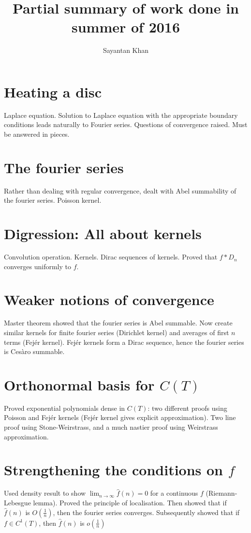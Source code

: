 \documentclass{article}
\title{Partial summary of work done in summer of 2016}
\author{Sayantan Khan}
\begin{document}
\maketitle

\section{Heating a disc}
Laplace equation. Solution to Laplace equation with the appropriate boundary conditions leads naturally to Fourier series. Questions of convergence raised. Must be answered in pieces.

\section{The fourier series}
Rather than dealing with regular convergence, dealt with Abel summability of the fourier series. Poisson kernel.

\section{Digression: All about kernels}
Convolution operation. Kernels. Dirac sequences of kernels. Proved that $f \ast D_n$ converges uniformly to $f$.

\section{Weaker notions of convergence}
Master theorem showed that the fourier series is Abel summable. Now create similar kernels for finite fourier series (Dirichlet kernel) and averages of first $n$ terms (Fejér kernel). Fejér kernels form a Dirac sequence, hence the fourier series is Cesàro summable.

\section{Orthonormal basis for $C(T)$}
Proved exponential polynomials dense in $C(T)$: two different proofs using Poisson and Fejér kernels (Fejér kernel gives explicit approximation). Two line proof using Stone-Weirstrass, and a much nastier proof using Weirstrass approximation.

\section{Strengthening the conditions on $f$}
Used density result to show $\displaystyle \lim_{n \rightarrow \infty} \hat{f}(n) = 0$ for a continuous $f$ (Riemann-Lebesgue lemma). Proved the principle of localisation. Then showed that if $\hat{f}(n)$ is $O\left( \frac{1}{n} \right)$, then the fourier series converges. Subsequently showed that if $f \in C^1(T)$, then $\hat{f}(n)$ is $o\left( \frac{1}{n} \right)$
\end{document}
